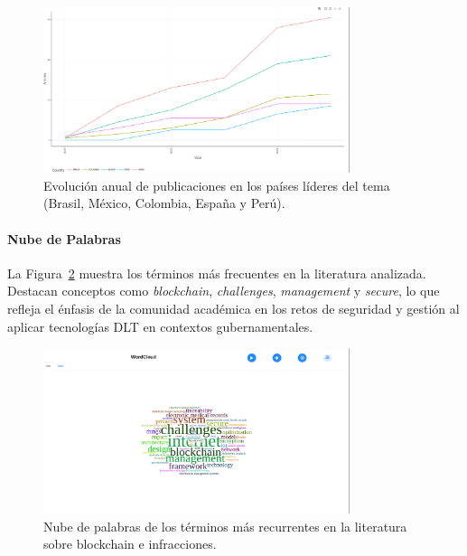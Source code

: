 \begin{figure}[htbp]
    \centering
    \includegraphics[width=0.8\textwidth]{Images/GraficoLineas.png}
    \caption{Evolución anual de publicaciones en los países líderes del tema (Brasil, México, Colombia, España y Perú).}
    \label{fig:grafico_lineas}
\end{figure}

\paragraph{Nube de Palabras}
La Figura~\ref{fig:nube_palabras} muestra los términos más frecuentes en la literatura analizada. Destacan conceptos como \textit{blockchain}, \textit{challenges}, \textit{management} y \textit{secure}, lo que refleja el énfasis de la comunidad académica en los retos de seguridad y gestión al aplicar tecnologías DLT en contextos gubernamentales.

\begin{figure}[htbp]
    \centering
    \includegraphics[width=0.8\textwidth]{Images/NubePalabras.png}
    \caption{Nube de palabras de los términos más recurrentes en la literatura sobre blockchain e infracciones.}
    \label{fig:nube_palabras}
\end{figure}
